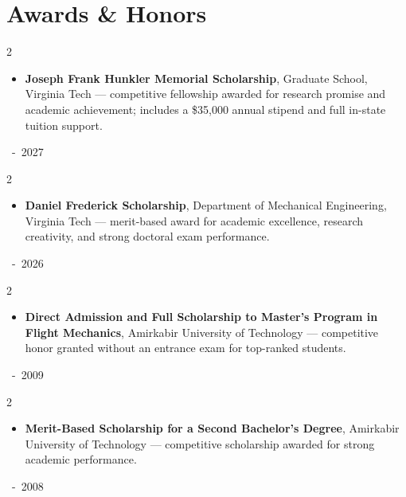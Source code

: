 \documentclass[10pt, letterpaper]{article}
\newenvironment{highlights}{
    \begin{itemize}[
        topsep=0.10 cm,
        parsep=0.10 cm,
        partopsep=0pt,
        itemsep=0pt,
        leftmargin=0.2 cm + 10pt
    ]
}{
    \end{itemize}
} %
\newenvironment{twocolentry}[2][]{
    \onecolentry
    \def\secondColumn{#2}
    \setcolumnwidth{\fill, 2.8 cm}
    \begin{paracol}{2}
}{
    \switchcolumn \raggedleft \secondColumn
    \end{paracol}
    \endonecolentry
} %
\begin{document}
\vspace{-.6em}
\section{Awards \& Honors}
\vspace{-.3em}
\begin{twocolentry}{
        2026~-~2027
        }
\begin{highlights}
\item \textbf{Joseph Frank Hunkler Memorial Scholarship}, Graduate School, Virginia Tech — competitive fellowship awarded for research promise and academic achievement; includes a \$35,000 annual stipend and full in-state tuition support.
\end{highlights}
\end{twocolentry}

\begin{twocolentry}{
        2025~-~2026
        }
\begin{highlights}
\item \textbf{Daniel Frederick Scholarship}, Department of Mechanical Engineering, Virginia Tech — merit-based award for academic excellence, research creativity, and strong doctoral exam performance.
\end{highlights}
\end{twocolentry}

\begin{twocolentry}{
        2008~-~2009
        }
\begin{highlights}
\item \textbf{Direct Admission and Full Scholarship to Master’s Program in Flight Mechanics}, Amirkabir University of Technology — competitive honor granted without an entrance exam for top-ranked students.
\end{highlights}
\end{twocolentry}

\begin{twocolentry}{
        2007~-~2008
        }
\begin{highlights}
\item \textbf{Merit-Based Scholarship for a Second Bachelor’s Degree}, Amirkabir University of Technology — competitive scholarship awarded for strong academic performance.
\end{highlights}
\end{twocolentry}


\end{document}
